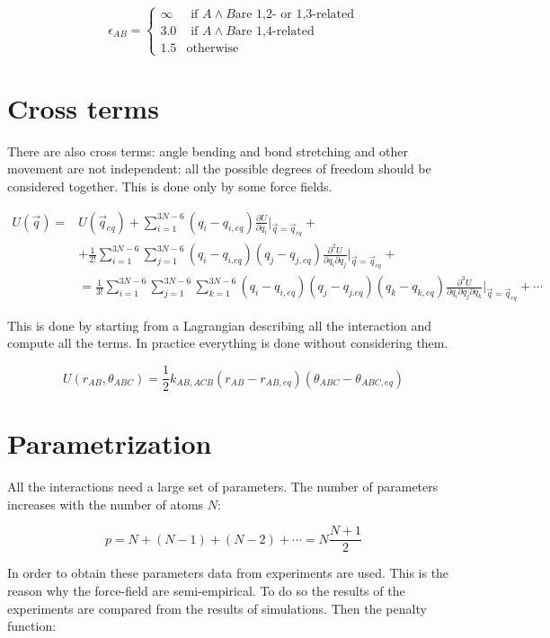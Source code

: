	$$\epsilon_{AB} = \begin{cases}\infty&\text{ if }A\land B\text{are 1,2- or 1,3-related}\\3.0&\text{ if }A\land B\text{are 1,4-related}\\1.5&\text{otherwise}\end{cases}$$

\section{Cross terms}
There are also cross terms: angle bending and bond stretching and other movement are not independent: all the possible degrees of freedom should be considered together.
This is done only by some force fields.

\begin{align*}
	U(\vec{q}) = &U(\vec{q}_{eq}) + \sum\limits_{i=1}^{3N-6}(q_i-q_{i,eq})\frac{\partial U}{\partial q_i}\biggr\vert_{\vec{q}=\vec{q}_{eq}} + \\
							 &+\frac{1}{2!}\sum\limits_{i=1}^{3N-6}\sum\limits_{j=1}^{3N-6}(q_i-q_{i.eq})(q_j-q_{j,eq})\frac{\partial^2 U}{\partial q_i\partial q_j}\biggr\vert_{\vec{q}=\vec{q}_{eq}} +\\
							 &=\frac{1}{3!}\sum\limits_{i=1}^{3N-6}\sum\limits_{j=1}^{3N-6}\sum\limits_{k=1}^{3N-6}(q_i-q_{i,eq})(q_j-q_{j.eq})(q_k-q_{k,eq})\frac{\partial^3 U}{\partial q_i\partial q_j\partial q_k}\biggr\vert_{\vec{q}=\vec{q}_{eq}} + \cdots
\end{align*}

This is done by starting from a Lagrangian describing all the interaction and compute all the terms.
In practice everything is done without considering them.

$$U(r_{AB}, \theta_{ABC}) = \frac{1}{2}k_{AB,ACB}(r_{AB}-r_{AB, eq})(\theta_{ABC}-\theta_{ABC, eq})$$

\section{Parametrization}
All the interactions need a large set of parameters.
The number of parameters increases with the number of atoms $N$:

$$p = N + (N-1)+(N-2)+\cdots = N\frac{N+1}{2}$$

In order to obtain these parameters data from experiments are used.
This is the reason why the force-field are semi-empirical.
To do so the results of the experiments are compared from the results of simulations.
Then the penalty function:

